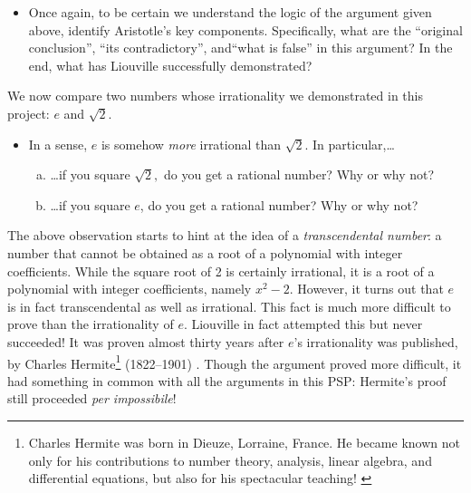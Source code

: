 \documentclass[11pt]{article}
\newcounter{tasknumb}
\newcommand{\tasknumb}[1]{\refstepcounter{tasknumb}\textmd{\textbf{$\fbox{$\fbox{Task \thetasknumb}$}$}}#1}
\newenvironment{task}[1][]%
 {\begin{itemize}
 \item[\tasknumb{#1}]  }
{
    \end{itemize}    }%
\begin{document}
\begin{task}
Once again, to be certain we understand the logic of the argument given above, identify Aristotle's key components.  Specifically, what are the ``{\sf original conclusion}'', ``{\sf its contradictory}'',
    and``{\sf what is false}'' in this argument?  In the end, what has Liouville successfully demonstrated?
\end{task}

We now compare two numbers whose irrationality we demonstrated in this project: $e$ and $\sqrt{2}$. 

\begin{task}
In a sense, $e$ is somehow \emph{more} irrational than $\sqrt{2}$.  In particular,\ldots
\begin{enumerate}[(a)]
\item \ldots if you square $\sqrt{2},$ do you get a rational number?  Why or why not?
\item \ldots if you square $e$, do you get a rational number?  Why or why not?
\end{enumerate}
\end{task}

The above observation starts to hint at the idea of a \emph{transcendental number}: a number that cannot be obtained as a root of a polynomial with integer coefficients.  While the square root of 2 is certainly irrational, it is a root of a polynomial with integer coefficients, namely $x^2-2.$  However, it turns out that $e$ is in fact transcendental as well as irrational.  This fact is much more difficult to prove than the irrationality of $e$.  Liouville in fact attempted this but never succeeded!  It was proven almost thirty years after $e$'s irrationality was published, by Charles Hermite\footnote{Charles Hermite was born in Dieuze, Lorraine, France. He became known not only for his contributions to number theory, analysis, linear algebra, and differential equations, but also for his spectacular teaching! \citep{HermiteBio} } (1822--1901) \citep{Hermite}.  Though the argument proved more difficult, it had something in common with all the arguments in this PSP: Hermite's proof still proceeded \emph{per impossibile}!

\vspace{0.1in}

\noindent\hrulefill

 
      {}                              
      \pagebreak 
      
\end{document}
